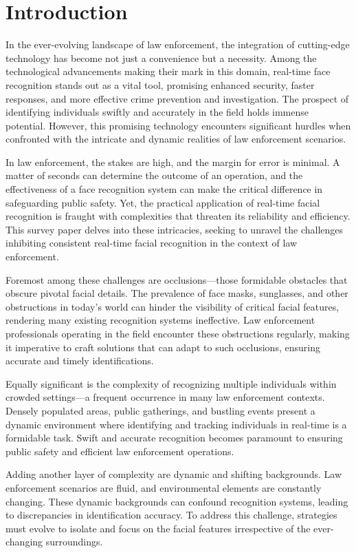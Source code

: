 \section{Introduction} \label{section:intro}
In the ever-evolving landscape of law enforcement, the integration of cutting-edge technology has become not just a convenience but a necessity. Among the technological advancements making their mark in this domain, real-time face recognition stands out as a vital tool, promising enhanced security, faster responses, and more effective crime prevention and investigation. The prospect of identifying individuals swiftly and accurately in the field holds immense potential. However, this promising technology encounters significant hurdles when confronted with the intricate and dynamic realities of law enforcement scenarios.

In law enforcement, the stakes are high, and the margin for error is minimal. A matter of seconds can determine the outcome of an operation, and the effectiveness of a face recognition system can make the critical difference in safeguarding public safety. Yet, the practical application of real-time facial recognition is fraught with complexities that threaten its reliability and efficiency. This survey paper delves into these intricacies, seeking to unravel the challenges inhibiting consistent real-time facial recognition in the context of law enforcement.

Foremost among these challenges are occlusions—those formidable obstacles that obscure pivotal facial details. The prevalence of face masks, sunglasses, and other obstructions in today's world can hinder the visibility of critical facial features, rendering many existing recognition systems ineffective. Law enforcement professionals operating in the field encounter these obstructions regularly, making it imperative to craft solutions that can adapt to such occlusions, ensuring accurate and timely identifications.

Equally significant is the complexity of recognizing multiple individuals within crowded settings—a frequent occurrence in many law enforcement contexts. Densely populated areas, public gatherings, and bustling events present a dynamic environment where identifying and tracking individuals in real-time is a formidable task. Swift and accurate recognition becomes paramount to ensuring public safety and efficient law enforcement operations.

Adding another layer of complexity are dynamic and shifting backgrounds. Law enforcement scenarios are fluid, and environmental elements are constantly changing. These dynamic backgrounds can confound recognition systems, leading to discrepancies in identification accuracy. To address this challenge, strategies must evolve to isolate and focus on the facial features irrespective of the ever-changing surroundings.


